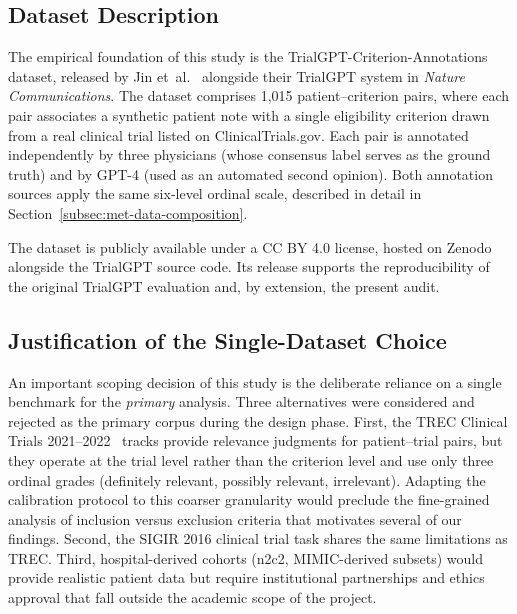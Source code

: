 \subsection{Dataset Description}
\label{subsec:ctx-desc}

The empirical foundation of this study is the 
TrialGPT-Criterion-Annotations dataset, released by Jin 
et~al.~\cite{jin2024trialgpt} alongside their TrialGPT system in 
\emph{Nature Communications}. The dataset comprises 1{,}015 
patient--criterion pairs, where each pair associates a synthetic 
patient note with a single eligibility criterion drawn from a real 
clinical trial listed on ClinicalTrials.gov. Each pair is annotated 
independently by three physicians (whose consensus label serves as 
the ground truth) and by GPT-4 (used as an automated second opinion). 
Both annotation sources apply the same six-level ordinal scale, 
described in detail in Section~\ref{subsec:met-data-composition}.

The dataset is publicly available under a CC BY 4.0 license, hosted on 
Zenodo alongside the TrialGPT source code. Its release supports the 
reproducibility of the original TrialGPT evaluation and, by extension, 
the present audit.

\subsection{Justification of the Single-Dataset Choice}
\label{subsec:ctx-single}

An important scoping decision of this study is the deliberate reliance 
on a single benchmark for the \emph{primary} analysis. Three 
alternatives were considered and rejected as the primary corpus during 
the design phase. First, the TREC Clinical Trials 2021--2022~\cite{roberts2021trec, roberts2022trec} 
tracks provide relevance judgments for patient--trial pairs, but they 
operate at the trial level rather than the criterion level and use 
only three ordinal grades (definitely relevant, possibly relevant, 
irrelevant). Adapting the calibration protocol to this coarser 
granularity would preclude the fine-grained analysis of inclusion 
versus exclusion criteria that motivates several of our findings. 
Second, the SIGIR 2016 clinical trial task shares the same limitations 
as TREC. Third, hospital-derived cohorts (n2c2, MIMIC-derived 
subsets) would provide realistic patient data but require 
institutional partnerships and ethics approval that fall outside the 
academic scope of the project.

